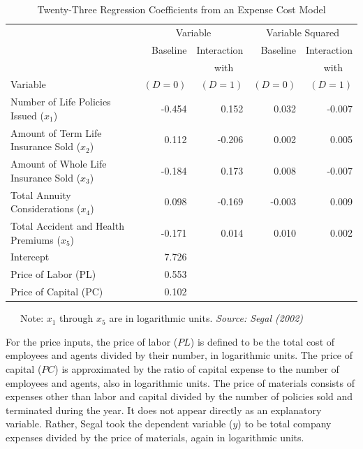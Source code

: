 \begin{center}  \begin{table}[h] \caption{\label{T3:Expenses}
Twenty-Three Regression Coefficients from an Expense Cost Model}
\begin{tabular}{l|rrrr}
\hline
 &  \multicolumn{2}{c}{Variable} &  \multicolumn{2}{c}{Variable
 Squared} \\
  &  Baseline &  Interaction  &  Baseline &  Interaction \\
  &   &   with~~   &   &   with~~  \\
Variable & $(D=0)$ &  $(D=1)$ & $(D=0)$ &  $(D=1)$\\
\hline Number of Life Policies Issued ($x_1$)     &  -0.454 & 0.152
& 0.032
& -0.007 \\
Amount of Term Life Insurance Sold ($x_2$)  & 0.112 & -0.206 & 0.002
& 0.005 \\
Amount of Whole Life Insurance Sold ($x_3$) & -0.184 & 0.173 & 0.008
& -0.007 \\
Total Annuity Considerations ($x_4$)        & 0.098 & -0.169 &
-0.003 & 0.009 \\
Total Accident and Health Premiums ($x_5$)  &-0.171 & 0.014 & 0.010
& 0.002 \\
Intercept  & 7.726 & & & \\
Price of Labor (PL) & 0.553 & & & \\
Price of Capital (PC) & 0.102 & & & \\
\hline
\end{tabular}
\newline
\flushleft ~~~Note: $x_1$ through $x_5$ are in logarithmic units.
\textit{Source: Segal (2002)}
\end{table}  \end{center}  
For the price inputs, the price of labor ($PL$) is defined to be the
total cost of employees and agents divided by their number, in
logarithmic units. The price of capital ($PC$) is approximated by
the ratio of capital expense to the number of employees and agents,
also in logarithmic units. The price of materials consists of
expenses other than labor and capital divided by the number of
policies sold and terminated during the year. It does not appear
directly as an explanatory variable. Rather, Segal took the
dependent variable ($y$) to be total company expenses divided by the
price of materials, again in logarithmic units.

